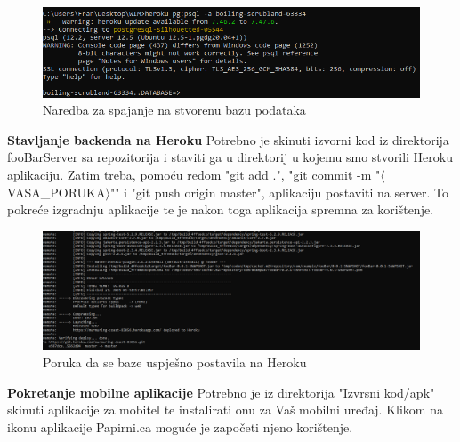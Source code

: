 			 \begin{figure}[H]
			 	\includegraphics[scale=0.8]{slike/baza_spajanje.PNG} 
			 	\centering
			 	\caption{Naredba za spajanje na stvorenu bazu podataka}
			 	\label{fig:baza_spajanje}%
			 \end{figure}
			 
			 \vspace{5mm}
			 \noindent \textbf{Stavljanje backenda na Heroku}\newline
			 Potrebno je skinuti izvorni kod iz direktorija fooBarServer sa repozitorija i staviti ga u direktorij u kojemu smo stvorili Heroku aplikaciju. Zatim treba, pomoću redom "git add .", "git commit -m "$\langle$VASA\_PORUKA$\rangle$"" i  "git push origin master", aplikaciju postaviti na server. To pokreće izgradnju aplikacije te je nakon toga aplikacija spremna za korištenje.
			 
			 \begin{figure}[H]
			 	\includegraphics[scale=0.4]{slike/izgradnja_gotova.PNG} 
			 	\centering
			 	\caption{Poruka da se baze uspješno postavila na Heroku}
			 	\label{fig:izgradnja_gotova}%
			 \end{figure}
			 
			 \vspace{5mm}
			 \noindent \textbf{Pokretanje mobilne aplikacije} \newline
			 Potrebno je iz direktorija "Izvrsni kod/apk" skinuti aplikacije za mobitel te instalirati onu za Vaš mobilni uređaj. Klikom na ikonu aplikacije Papirni.ca moguće je započeti njeno korištenje.
			 
			\eject 